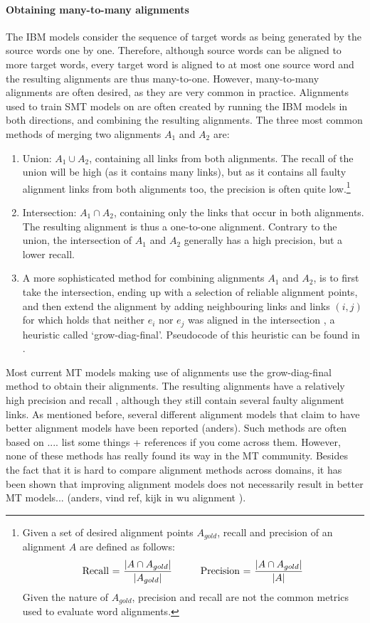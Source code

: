 \documentclass{report}
\begin{document}
\paragraph{Obtaining many-to-many alignments}
The IBM models consider the sequence of target words as being generated by the source words one by one. Therefore, although source words can be aligned to more target words, every target word is aligned to at most one source word and the resulting alignments are thus many-to-one. However, many-to-many alignments are often desired, as they are very common in practice. Alignments used to train SMT models on are often created by running the IBM models in both directions, and combining the resulting alignments. The three most common methods of merging two alignments $A_1$ and $A_2$ are:\begin{enumerate}
\item Union: $A_1\cup A_2$, containing all links from both alignments. The recall of the union will be high (as it contains many links), but as it contains all faulty alignment links from both alignments too, the precision is often quite low.\footnote{Given a set of desired alignment points $A_{gold}$, recall and precision of an alignment $A$ are defined as follows:\\
$$\text{Recall = }\frac{|A \cap A_{gold}|}{|A_{gold}|} \text{\hspace{10mm}Precision = }\frac{|A \cap A_{gold}|}{|A|}$$
Given the nature of $A_{gold}$, precision and recall are not the common metrics used to evaluate word alignments.}
\item Intersection: $A_1\cap A_2$, containing only the links that occur in both alignments. The resulting alignment is thus a one-to-one alignment. Contrary to the union, the intersection of $A_1$ and $A_2$ generally has a high precision, but a lower recall.
\item A more sophisticated method for combining alignments $A_1$ and $A_2$, is to first take the intersection, ending up with a selection of reliable alignment points, and then extend the alignment by adding neighbouring links and links $(i,j)$ for which holds that neither $e_i$ nor $e_j$ was aligned in the intersection \citep{och2000improved}, a heuristic called `grow-diag-final'. Pseudocode of this heuristic can be found in \cite{koehn2008statistical}.
\end{enumerate}

Most current MT models making use of alignments use the grow-diag-final method to obtain their alignments. The resulting alignments have a relatively high precision and recall \citep{och2000improved}, although they still contain several faulty alignment links. As mentioned before, several different alignment models that claim to have better alignment models have been reported (anders). Such methods are often based on .... list some things + references if you come across them. However, none of these methods has really found its way in the MT community. Besides the fact that it is hard to compare alignment methods across domains, it has been shown that improving alignment models does not necessarily result in better MT models... (anders, vind ref, kijk in wu alignment \cite{indurkhya2010handbook}).
\end{document}
